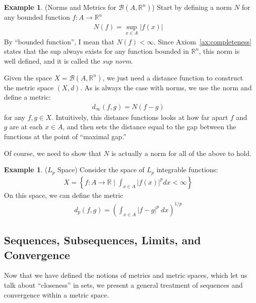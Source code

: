 \documentclass[12pt]{article}
\numberwithin{equation}{section} %
\theoremstyle{plain}
\theoremstyle{definition}
\newtheorem{ex}[thm]{Example}
\theoremstyle{remark}
\newcommand{\R}{\mathbb{R}}
\begin{document}
\begin{ex}{(Norms and Metrics for $\mathscr{B}(A,\R^n)$)}
Start by defining a norm $N$ for any bounded function $f:A
\rightarrow \R^n$
\begin{align*}
  N(f) = \sup_{x\in A} |f(x)|
\end{align*}
By ``bounded function'', I mean that $N(f)<\infty$.  Since
Axiom~\ref{ax:completeness} states that the sup always exists for any
function bounded in $\R^n$, this norm is well
defined, and it is called the \emph{sup norm}.

Given the space $X=\mathscr{B}(A,\R^n)$, we just need a distance
function to construct the metric space $(X,d)$. As is always the case
with norms, we use the norm and define a metric:
\begin{align*}
  d_\infty(f,g) = N(f-g)
\end{align*}
for any $f,g\in X$. Intuitively, this distance functions looks at how
far apart $f$ and $g$ are at each $x\in A$, and then sets the distance
equal to the gap between the functions at the point of ``maximal gap.''

Of course, we need to show that $N$ is actually a norm for all of the
above to hold.
\end{ex}

\begin{ex}{($L_p$ Space)}
Consider the space of $L_p$ integrable functions:
\begin{align*}
  X = \left\{
    f:A\rightarrow \R \; \big|\;
    \int_{x\in A} |f(x)|^p dx <\infty
  \right\}
\end{align*}
On this space, we can define the metric
\begin{align*}
  d_p(f,g) = \left(\int_{x\in A} |f-g|^p \; dx\right)^{1/p}
\end{align*}
\end{ex}

\subsection{Sequences, Subsequences, Limits, and Convergence}

Now that we have defined the notions of metrics and metric spaces, which
let us talk about ``closeness'' in sets, we present a general treatment
of sequences and convergence within a metric space.
\end{document}
